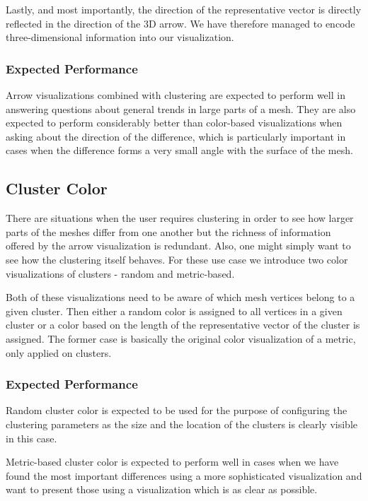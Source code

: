 Lastly, and most importantly, the direction of the representative vector is directly reflected in the direction of the 3D arrow. We have therefore managed to encode three-dimensional information into our visualization.

\subsubsection{Expected Performance}

Arrow visualizations combined with clustering are expected to perform well in answering questions about general trends in large parts of a mesh. They are also expected to perform considerably better than color-based visualizations when asking about the direction of the difference, which is particularly important in cases when the difference forms a very small angle with the surface of the mesh.
\subsection{Cluster Color}

There are situations when the user requires clustering in order to see how larger parts of the meshes differ from one another but the richness of information offered by the arrow visualization is redundant. Also, one might simply want to see how the clustering itself behaves. For these use case we introduce two color visualizations of clusters - random and metric-based.

Both of these visualizations need to be aware of which mesh vertices belong to a given cluster. Then either a random color is assigned to all vertices in a given cluster or a color based on the length of the representative vector of the cluster is assigned. The former case is basically the original color visualization of a metric, only applied on clusters.

\subsubsection{Expected Performance}

Random cluster color is expected to be used for the purpose of configuring the clustering parameters as the size and the location of the clusters is clearly visible in this case.

Metric-based cluster color is expected to perform well in cases when we have found the most important differences using a more sophisticated visualization and want to present those using a visualization which is as clear as possible.
